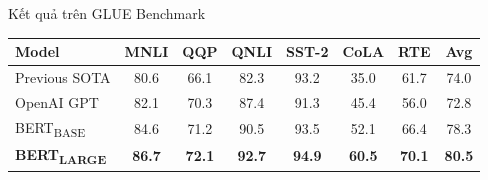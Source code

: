 \documentclass[aspectratio=169,10pt]{beamer}
\begin{document}
\begin{frame}{Kết quả trên GLUE Benchmark}
\begin{center}
\small
\begin{tabular}{l|cccccc|c}
\toprule
\textbf{Model} & MNLI & QQP & QNLI & SST-2 & CoLA & RTE & \textbf{Avg} \\
\midrule
Previous SOTA & 80.6 & 66.1 & 82.3 & 93.2 & 35.0 & 61.7 & 74.0 \\
OpenAI GPT & 82.1 & 70.3 & 87.4 & 91.3 & 45.4 & 56.0 & 72.8 \\
\midrule
BERT\textsubscript{BASE} & 84.6 & 71.2 & 90.5 & 93.5 & 52.1 & 66.4 & 78.3 \\
\textbf{BERT\textsubscript{LARGE}} & \textbf{86.7} & \textbf{72.1} & \textbf{92.7} & \textbf{94.9} & \textbf{60.5} & \textbf{70.1} & \textbf{80.5} \\
\bottomrule
\end{tabular}
\end{center}

\vspace{0.5em}
\begin{center}
\end{center}
\end{frame}
\end{document}
